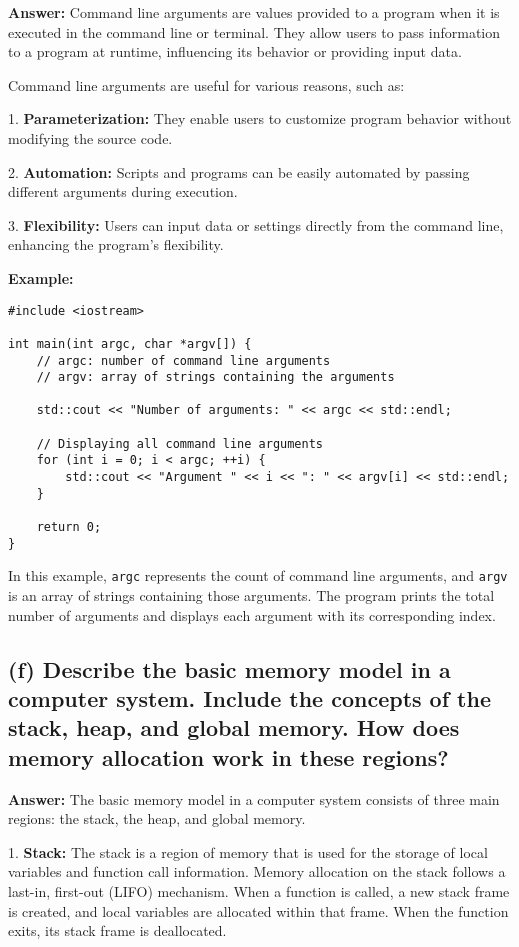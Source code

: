 \documentclass{article}
\begin{document}
\begin{enumerate}
\textbf{Answer:} Command line arguments are values provided to a program when it is executed in the command line or terminal. They allow users to pass information to a program at runtime, influencing its behavior or providing input data.

Command line arguments are useful for various reasons, such as:

1. \textbf{Parameterization:} They enable users to customize program behavior without modifying the source code.

2. \textbf{Automation:} Scripts and programs can be easily automated by passing different arguments during execution.

3. \textbf{Flexibility:} Users can input data or settings directly from the command line, enhancing the program's flexibility.

\textbf{Example:}
\begin{verbatim}
#include <iostream>

int main(int argc, char *argv[]) {
    // argc: number of command line arguments
    // argv: array of strings containing the arguments

    std::cout << "Number of arguments: " << argc << std::endl;

    // Displaying all command line arguments
    for (int i = 0; i < argc; ++i) {
        std::cout << "Argument " << i << ": " << argv[i] << std::endl;
    }

    return 0;
}
\end{verbatim}

In this example, \texttt{argc} represents the count of command line arguments, and \texttt{argv} is an array of strings containing those arguments. The program prints the total number of arguments and displays each argument with its corresponding index.
\subsection*{(f) Describe the basic memory model in a computer system. Include the concepts of the stack, heap, and global memory. How does memory allocation work in these regions?}

\textbf{Answer:} The basic memory model in a computer system consists of three main regions: the stack, the heap, and global memory.

1. \textbf{Stack:} The stack is a region of memory that is used for the storage of local variables and function call information. Memory allocation on the stack follows a last-in, first-out (LIFO) mechanism. When a function is called, a new stack frame is created, and local variables are allocated within that frame. When the function exits, its stack frame is deallocated.


\end{enumerate}
\end{document}
